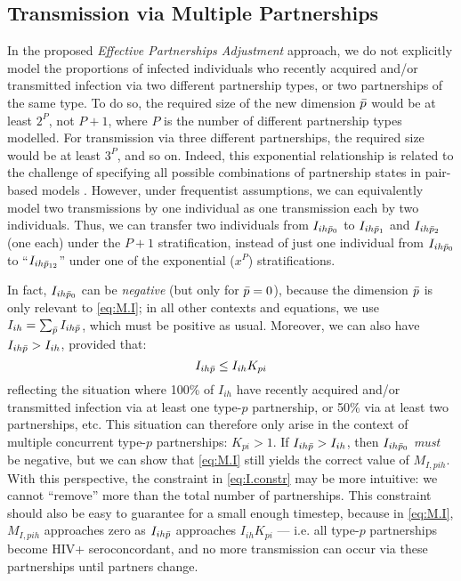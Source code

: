 \subsection{Transmission via Multiple Partnerships}\label{foi.prop.mp}
In the proposed \emph{Effective Partnerships Adjustment} approach,
we do not explicitly model the proportions of infected individuals
who recently acquired and/or transmitted infection via
two different partnership types, or two partnerships of the same type.
To do so, the required size of the new dimension $\bar{p}$ would be at least $2^{P}$, not $P+1$,
where $P$ is the number of different partnership types modelled.
For transmission via three different partnerships,
the required size would be at least $3^{P}$, and so on.
Indeed, this exponential relationship is related to the challenge of specifying
all possible combinations of partnership states in pair-based models \cite{Kretzschmar2017}.
However, under frequentist assumptions, we can equivalently model
two transmissions by one individual as one transmission each by two individuals.
Thus, we can transfer two individuals from $I_{ih\bar{p}_0}$ to
$I_{ih\bar{p}_1}$ and $I_{ih\bar{p}_2}$ (one each) under the $P+1$ stratification,
instead of just one individual from $I_{ih\bar{p}_0}$ to
``$I_{ih\bar{p}_{12}}$'' under one of the exponential ($x^P$) stratifications.
\par
In fact, $I_{ih\bar{p}_0}$ can be \emph{negative} (but only for $\bar{p} = 0$),
because the dimension $\bar{p}$ is only relevant to \eqref{eq:M.I};
in all other contexts and equations,
we use $I_{ih} = \sum_{\bar{p}} I_{ih\bar{p}}$, which must be positive as usual.
Moreover, we can also have $I_{ih\bar{p}} > I_{ih}$, provided that:
\begin{equation}\label{eq:I.constr}
  I_{ih\bar{p}} \le I_{ih} K_{pi}
\end{equation}
reflecting the situation where 100\% of $I_{ih}$
have recently acquired and/or transmitted infection via at least one type-$p$ partnership,
or 50\% via at least two partnerships, etc.
This situation can therefore only arise in the context of
multiple concurrent type-$p$ partnerships: $K_{pi} > 1$.
If $I_{ih\bar{p}} > I_{ih}$, then $I_{ih\bar{p}_0}$ \emph{must} be negative,
but we can show that \eqref{eq:M.I} still yields the correct value of $M_{I,pih}$.
With this perspective, the constraint in \eqref{eq:I.constr} may be more intuitive:
we cannot ``remove'' more than the total number of partnerships.
This constraint should also be easy to guarantee for a small enough timestep,
because in \eqref{eq:M.I}, $M_{I,pih}$ approaches zero as $I_{ih\bar{p}}$ approaches $I_{ih} K_{pi}$
--- i.e. all type-$p$ partnerships become HIV+ seroconcordant,
and no more transmission can occur via these partnerships until partners change.

